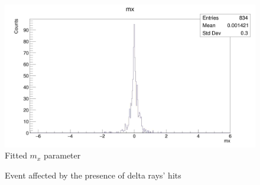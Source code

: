 \documentclass[10pt, a4paper, twocolumn]{article} %
\begin{document}
\begin{figure}[h!]
    \centering
    \includegraphics[width=0.8 \textwidth]{img/mx.jpg}
    \caption{Fitted $m_x$ parameter}
    \label{fig:mx}
\end{figure}

\onecolumn
\begin{figure}[h!]
    \centering
    \caption{Event affected by the presence of delta rays' hits}
    \label{fig:bad}
\end{figure}
\end{document}
